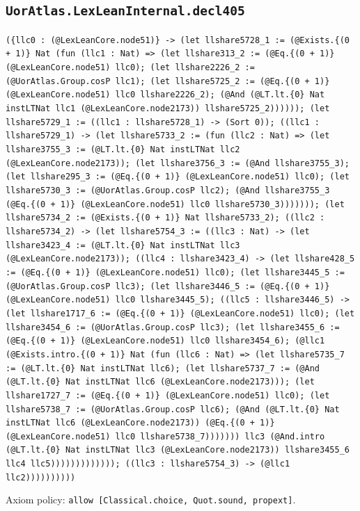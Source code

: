 \documentclass[11pt]{article}
\begin{document}
\subsection*{\texttt{UorAtlas.LexLeanInternal.decl405}}
\noindent\texttt{(\{llc0 : (@LexLeanCore.node51)\} -> (let llshare5728\_1 := (@Exists.\{(0 + 1)\} Nat (fun (llc1 : Nat) => (let llshare313\_2 := (@Eq.\{(0 + 1)\} (@LexLeanCore.node51) llc0); (let llshare2226\_2 := (@UorAtlas.Group.cosP llc1); (let llshare5725\_2 := (@Eq.\{(0 + 1)\} (@LexLeanCore.node51) llc0 llshare2226\_2); (@And (@LT.lt.\{0\} Nat instLTNat llc1 (@LexLeanCore.node2173)) llshare5725\_2)))))); (let llshare5729\_1 := ((llc1 : llshare5728\_1) -> (Sort 0)); ((llc1 : llshare5729\_1) -> (let llshare5733\_2 := (fun (llc2 : Nat) => (let llshare3755\_3 := (@LT.lt.\{0\} Nat instLTNat llc2 (@LexLeanCore.node2173)); (let llshare3756\_3 := (@And llshare3755\_3); (let llshare295\_3 := (@Eq.\{(0 + 1)\} (@LexLeanCore.node51) llc0); (let llshare5730\_3 := (@UorAtlas.Group.cosP llc2); (@And llshare3755\_3 (@Eq.\{(0 + 1)\} (@LexLeanCore.node51) llc0 llshare5730\_3))))))); (let llshare5734\_2 := (@Exists.\{(0 + 1)\} Nat llshare5733\_2); ((llc2 : llshare5734\_2) -> (let llshare5754\_3 := ((llc3 : Nat) -> (let llshare3423\_4 := (@LT.lt.\{0\} Nat instLTNat llc3 (@LexLeanCore.node2173)); ((llc4 : llshare3423\_4) -> (let llshare428\_5 := (@Eq.\{(0 + 1)\} (@LexLeanCore.node51) llc0); (let llshare3445\_5 := (@UorAtlas.Group.cosP llc3); (let llshare3446\_5 := (@Eq.\{(0 + 1)\} (@LexLeanCore.node51) llc0 llshare3445\_5); ((llc5 : llshare3446\_5) -> (let llshare1717\_6 := (@Eq.\{(0 + 1)\} (@LexLeanCore.node51) llc0); (let llshare3454\_6 := (@UorAtlas.Group.cosP llc3); (let llshare3455\_6 := (@Eq.\{(0 + 1)\} (@LexLeanCore.node51) llc0 llshare3454\_6); (@llc1 (@Exists.intro.\{(0 + 1)\} Nat (fun (llc6 : Nat) => (let llshare5735\_7 := (@LT.lt.\{0\} Nat instLTNat llc6); (let llshare5737\_7 := (@And (@LT.lt.\{0\} Nat instLTNat llc6 (@LexLeanCore.node2173))); (let llshare1727\_7 := (@Eq.\{(0 + 1)\} (@LexLeanCore.node51) llc0); (let llshare5738\_7 := (@UorAtlas.Group.cosP llc6); (@And (@LT.lt.\{0\} Nat instLTNat llc6 (@LexLeanCore.node2173)) (@Eq.\{(0 + 1)\} (@LexLeanCore.node51) llc0 llshare5738\_7))))))) llc3 (@And.intro (@LT.lt.\{0\} Nat instLTNat llc3 (@LexLeanCore.node2173)) llshare3455\_6 llc4 llc5))))))))))))); ((llc3 : llshare5754\_3) -> (@llc1 llc2))))))))))}\par
\noindent Axiom policy: \texttt{allow [Classical.choice, Quot.sound, propext]}.\par
\end{document}
